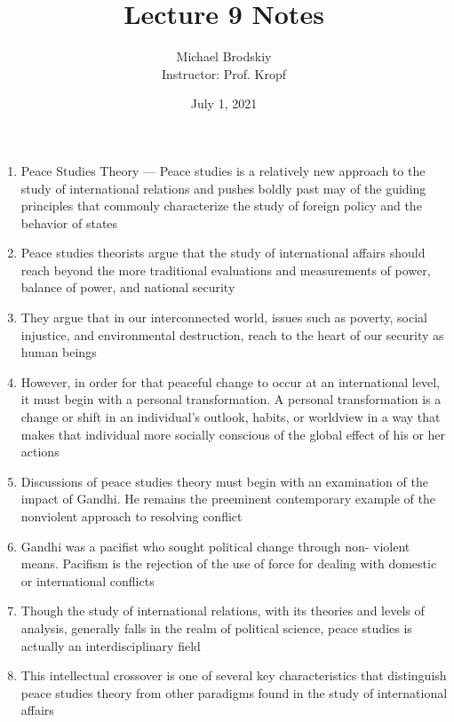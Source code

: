 \documentclass[12pt]{article}
\title{Lecture 9 Notes}
\date{July 1, 2021}
\author{Michael Brodskiy\\ \small Instructor: Prof. Kropf}
\begin{document}
    \maketitle

    \begin{enumerate}

      \item Peace Studies Theory — Peace studies is a relatively new approach to the study of international relations and pushes boldly past may of the guiding principles that commonly characterize the study of foreign policy and the behavior of states

      \item Peace studies theorists argue that the study of international affairs should reach beyond the more traditional evaluations and measurements of power, balance of power, and national security

      \item They argue that in our interconnected world, issues such as poverty, social injustice, and environmental destruction, reach to the heart of our security as human beings

      \item However, in order for that peaceful change to occur at an international level, it must begin with a personal transformation. A personal transformation is a change or shift in an individual’s outlook, habits, or worldview in a way that makes that individual more socially conscious of the global effect of his or her actions

      \item Discussions of peace studies theory must begin with an examination of the impact of Gandhi. He remains the preeminent contemporary example of the nonviolent approach to resolving conflict

      \item Gandhi was a pacifist who sought political change through non- violent means.  Pacifism is the rejection of the use of force for dealing with domestic or international conflicts

      \item Though the study of international relations, with its theories and levels of analysis, generally falls in the realm of political science, peace studies is actually an interdisciplinary field

      \item This intellectual crossover is one of several key characteristics that distinguish peace studies theory from other paradigms found in the study of international affairs


\end{enumerate}
\end{document}
